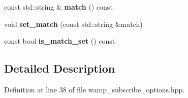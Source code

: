 \begin{DoxyCompactItemize}
\item 
const std\+::string \& {\bfseries match} () const \hypertarget{classautobahn_1_1wamp__subscribe__options_a34147a3c7076835a18346d1fd5a5e124}{}\label{classautobahn_1_1wamp__subscribe__options_a34147a3c7076835a18346d1fd5a5e124}

\item 
void {\bfseries set\+\_\+match} (const std\+::string \&match)\hypertarget{classautobahn_1_1wamp__subscribe__options_a88e32ec78d8ff8e168473c5b59f9fdc5}{}\label{classautobahn_1_1wamp__subscribe__options_a88e32ec78d8ff8e168473c5b59f9fdc5}

\item 
const bool {\bfseries is\+\_\+match\+\_\+set} () const \hypertarget{classautobahn_1_1wamp__subscribe__options_a0e0ae508776f57eb490adaa84bc45867}{}\label{classautobahn_1_1wamp__subscribe__options_a0e0ae508776f57eb490adaa84bc45867}

\end{DoxyCompactItemize}


\subsection{Detailed Description}


Definition at line 38 of file wamp\+\_\+subscribe\+\_\+options.\+hpp.

